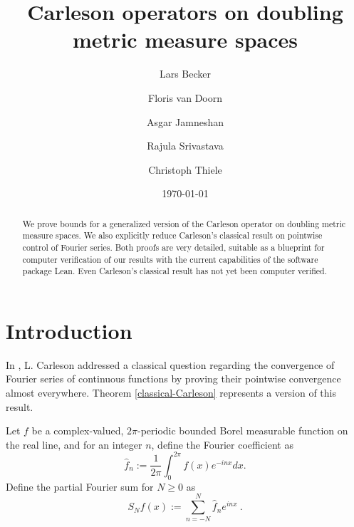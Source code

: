 
%
\title{Carleson operators on doubling metric measure spaces}

\author{Lars Becker \and Floris van Doorn \and Asgar Jamneshan \and Rajula Srivastava \and Christoph Thiele}

\date{\today}

\maketitle

\begin{abstract}
    We prove bounds for a generalized version of the Carleson operator on doubling metric measure spaces.
    We also explicitly reduce Carleson's classical result on pointwise control of Fourier series.
    Both proofs are very detailed, suitable as a blueprint for computer verification of our results with
    the current capabilities of the software package Lean.
    Even Carleson's classical result has not yet been computer verified.
\end{abstract}

\tableofcontents

\chapter{Introduction}

In \cite{carleson}, L. Carleson addressed a classical question regarding the convergence of Fourier series of continuous functions by proving their pointwise convergence almost everywhere. Theorem \ref{classical-Carleson} represents a version of this result.

Let $f$ be a complex-valued, $2\pi$-periodic bounded Borel measurable function on the real line, and for an integer $n$, define the Fourier coefficient as
\begin{equation}
    \widehat{f}_n:=\frac {1}{2\pi} \int_0^{2\pi} f(x) e^{- i nx} dx .
\end{equation}
Define the partial Fourier sum for $N\ge 0$ as
\begin{equation}
    S_Nf(x):=\sum_{n=-N}^N \widehat{f}_n e^{i nx}\ .
\end{equation}

